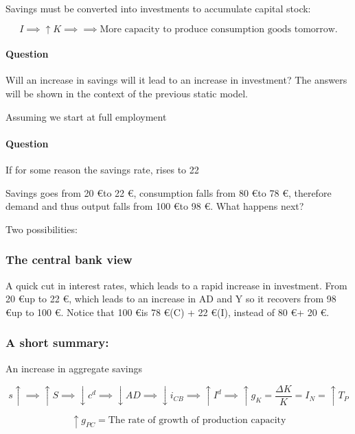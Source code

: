 \documentclass{report}
\begin{document}
	Savings must be converted into investments to accumulate capital stock:
	
	$$I\implies \uparrow K \implies \implies \text{More capacity to produce consumption goods tomorrow.}$$


\paragraph{Question} Will an increase in savings will it lead to an increase in investment? The answers will be shown in the context of the previous static model. 

Assuming we start at full employment

 
 
 \paragraph{Question} If for some reason the savings rate, rises to 22%

	Savings goes from 20 \euro to 22 \euro, consumption falls from 80 \euro to 78 \euro, therefore demand and thus output falls from 100 \euro to 98 \euro. What happens next? 
	
		Two possibilities:
	
	\subsubsection{The central bank view}
			A quick cut in interest rates, which leads to a rapid increase in investment. From 20 \euro up to 22 \euro, which leads to an increase in AD and Y so it recovers from 98 \euro up to 100 \euro. Notice that 100 \euro is 78 \euro (C) + 22 \euro (I), instead of 80 \euro + 20 \euro. 
			
		\subsubsection{A short summary:} 
An increase in aggregate savings

$$ s \uparrow \implies \uparrow S \implies \downarrow c^d \implies \downarrow AD \implies \downarrow i_{CB} \implies \uparrow I^d \implies \uparrow g_K = \frac{\Delta K}{K} = I_N = \uparrow T_P$$

$$\uparrow g_{PC} = \text{The rate of growth of production capacity}$$
\end{document}
